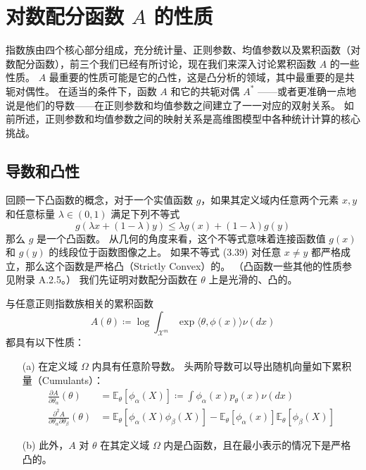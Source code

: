 \section{对数配分函数 $A$ 的性质}

指数族由四个核心部分组成，充分统计量、正则参数、均值参数以及累积函数（对数配分函数），前三个我们已经有所讨论，现在我们来深入讨论累积函数 $A$ 的一些性质。
$A$ 最重要的性质可能是它的凸性，这是凸分析的领域，其中最重要的是共轭对偶性。
在适当的条件下，函数 $A$ 和它的共轭对偶 $A^*$ ——或者更准确一点地说是他们的导数——在正则参数和均值参数之间建立了一一对应的双射关系。
如前所述，正则参数和均值参数之间的映射关系是高维图模型中各种统计计算的核心挑战。

\subsection{导数和凸性}

回顾一下凸函数的概念，对于一个实值函数 $g$，如果其定义域内任意两个元素 $x, y$ 和任意标量 $\lambda \in (0, 1)$ 满足下列不等式
\begin{equation}
    g(\lambda x + (1-\lambda)y) \leq \lambda g(x) + (1-\lambda)g(y)
\end{equation}
那么 $g$ 是一个凸函数。
从几何的角度来看，这个不等式意味着连接函数值 $g(x)$ 和 $g(y)$ 的线段位于函数图像之上。
如果不等式 (3.39) 对任意 $x \neq y$ 都严格成立，那么这个函数是严格凸（Strictly Convex）的。
（凸函数一些其他的性质参见附录 A.2.5。）
我们先证明对数配分函数在 $\theta$ 上是光滑的、凸的。

\begin{tcolorbox}
\begin{prop}

与任意正则指数族相关的累积函数
\begin{equation}
    A(\theta) \coloneqq \log \int_{\mathcal{X}^m}\exp\langle \theta, \phi(x) \rangle \nu(dx)
\end{equation}
都具有以下性质：

\begin{itemize}
    \item[(a)] 在定义域 $\Omega$ 内具有任意阶导数。
        头两阶导数可以导出随机向量如下累积量（Cumulants）：
        \begin{subequations}
        \begin{align}
            \frac{\partial A}{\partial \theta_{\alpha}}(\theta) &= \mathbb{E}_{\theta}[\phi_{\alpha}(X)] \coloneqq \int \phi_{\alpha}(x)p_{\theta}(x)\nu(dx) \\
            \frac{\partial^2 A}{\partial\theta_{\alpha}\partial\theta_{\beta}}(\theta) &= \mathbb{E}_{\theta}[\phi_{\alpha}(X)\phi_{\beta}(X)] - \mathbb{E}_{\theta}[\phi_{\alpha}(x)]\mathbb{E}_{\theta}[\phi_{\beta}(X)]
        \end{align}
        \end{subequations}
    \item[(b)] 此外，$A$ 对 $\theta$ 在其定义域 $\Omega$ 内是凸函数，且在最小表示的情况下是严格凸的。
\end{itemize}

\end{prop}
\end{tcolorbox}

